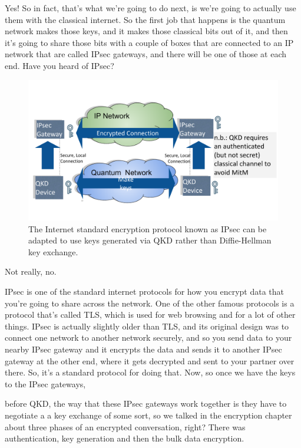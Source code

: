 \rrr Yes! So in fact, that's what we're going to do next, is we're going to actually use them with the classical internet. So the first job that happens is the quantum network makes those keys, and it makes those classical bits out of it, and then it's going to share those bits with a couple of boxes that are connected to an IP network that are called IPsec gateways, and there will be one of those at each end. Have you heard of IPsec?

\begin{figure}[t]
    \centering
    \includegraphics[width=1\textwidth]{lesson15/R2L15fig4.pdf}
    \caption[IPsec with QKD]{The Internet standard encryption protocol known as IPsec can be adapted to use keys generated via QKD rather than Diffie-Hellman key exchange.}
    \label{fig:15-4-ipsec-with-qkd}
\end{figure}

\mmm Not really, no.

\rrr IPsec is one of the standard internet protocols for how you encrypt data that you're going to share across the network. One of the other famous protocols is a protocol that's called TLS, which is used for web browsing and for a lot of other things. IPsec is actually slightly older than TLS, and its original design was to connect one network to another network securely, and so you send data to your nearby IPsec gateway and it encrypts the data and sends it to another IPsec gateway at the other end, where it gets decrypted and sent to your partner over there. So, it's a standard protocol for doing that. Now, so once we have the keys to the IPsec gateways,

before QKD, the way that these IPsec gateways work together is they have to negotiate a a key exchange of some sort, so we talked in the encryption chapter about three phases of an encrypted conversation, right? There was authentication, key generation and then the bulk data encryption.

